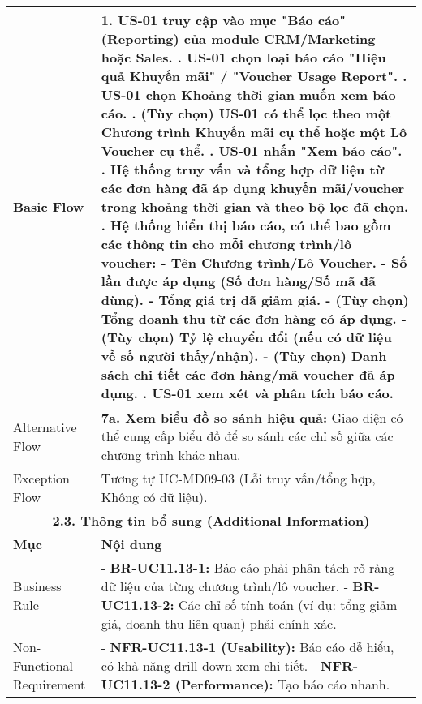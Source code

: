 \begin{longtable}{|m{4cm}|p{11cm}|}
\hline
Basic Flow & 1. US-01 truy cập vào mục "Báo cáo" (Reporting) của module CRM/Marketing hoặc Sales. \newline 2. US-01 chọn loại báo cáo "Hiệu quả Khuyến mãi" / "Voucher Usage Report". \newline 3. US-01 chọn Khoảng thời gian muốn xem báo cáo. \newline 4. (Tùy chọn) US-01 có thể lọc theo một Chương trình Khuyến mãi cụ thể hoặc một Lô Voucher cụ thể. \newline 5. US-01 nhấn "Xem báo cáo". \newline 6. Hệ thống truy vấn và tổng hợp dữ liệu từ các đơn hàng đã áp dụng khuyến mãi/voucher trong khoảng thời gian và theo bộ lọc đã chọn. \newline 7. Hệ thống hiển thị báo cáo, có thể bao gồm các thông tin cho mỗi chương trình/lô voucher: \newline    - Tên Chương trình/Lô Voucher. \newline    - Số lần được áp dụng (Số đơn hàng/Số mã đã dùng). \newline    - Tổng giá trị đã giảm giá. \newline    - (Tùy chọn) Tổng doanh thu từ các đơn hàng có áp dụng. \newline    - (Tùy chọn) Tỷ lệ chuyển đổi (nếu có dữ liệu về số người thấy/nhận). \newline    - (Tùy chọn) Danh sách chi tiết các đơn hàng/mã voucher đã áp dụng. \newline 8. US-01 xem xét và phân tích báo cáo. \\
\hline
Alternative Flow & \textbf{7a. Xem biểu đồ so sánh hiệu quả:} Giao diện có thể cung cấp biểu đồ để so sánh các chỉ số giữa các chương trình khác nhau. \\
\hline
Exception Flow & Tương tự UC-MD09-03 (Lỗi truy vấn/tổng hợp, Không có dữ liệu). \\
\hline
\multicolumn{2}{|c|}{\textbf{2.3. Thông tin bổ sung (Additional Information)}} \\
\hline
\textbf{Mục} & \textbf{Nội dung} \\
\hline
Business Rule & - \textbf{BR-UC11.13-1:} Báo cáo phải phân tách rõ ràng dữ liệu của từng chương trình/lô voucher. \newline - \textbf{BR-UC11.13-2:} Các chỉ số tính toán (ví dụ: tổng giảm giá, doanh thu liên quan) phải chính xác. \\
\hline
Non-Functional Requirement & - \textbf{NFR-UC11.13-1 (Usability):} Báo cáo dễ hiểu, có khả năng drill-down xem chi tiết. \newline - \textbf{NFR-UC11.13-2 (Performance):} Tạo báo cáo nhanh. \\
\hline
\end{longtable}


